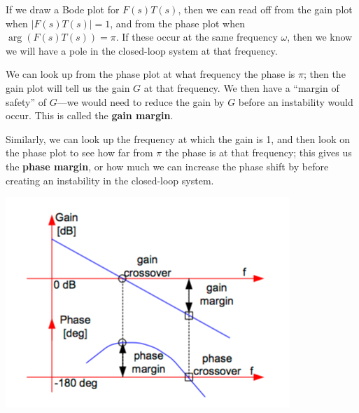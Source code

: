 \documentclass{article}
\begin{document}
If we draw a Bode plot for $F(s)T(s)$, then we can read off from the gain plot when $|F(s)T(s)|=1$, and from the phase plot when $\arg(F(s)T(s))=\pi$. If these occur at the same frequency $\omega$, then we know we will have a pole in the closed-loop system at that frequency.

We can look up from the phase plot at what frequency the phase is $\pi$; then the gain plot will tell us the gain $G$ at that frequency. We then have a ``margin of safety'' of $G$---we would need to reduce the gain by $G$ before an instability would occur. This is called the \textbf{gain margin}.

Similarly, we can look up the frequency at which the gain is 1, and then look on the phase plot to see how far from $\pi$ the phase is at that frequency; this gives us the \textbf{phase margin}, or how much we can increase the phase shift by before creating an instability in the closed-loop system.

\begin{center}
	\includegraphics[scale=0.5]{BodeMargins.jpg}
\end{center}
\end{document}
